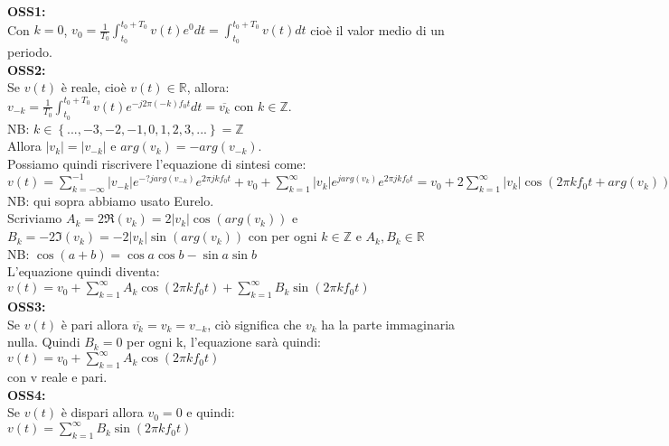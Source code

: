 	\textbf{OSS1:}\\
	Con $ k=0$, $ 
		v_0
		= \frac{1}{T_0}\int_{t_0}^{ t_0+T_0} v(t) e^0 dt
		=\int_{t_0}^{ t_0+T_0} v(t) dt
	$ cioè il valor medio di un periodo.\\ %
	\textbf{OSS2:}\\
	Se $ v(t) $ è reale, cioè $ v(t) \in \mathbb{R}$, allora:\\
	$ v_{-k} =\frac{1}{T_0} \int_{t_0}^{ t_0+T_0} v(t) e^{-j 2 \pi(-k) f_0 t} dt =\overline{v_k}  $ con $ k \in \mathbb{Z}$.\\
	NB: $ k \in \left \{ ...,-3,-2,-1,0,1,2,3,... \right \} = \mathbb{Z} $\\
	Allora $|v_k|=|v_{-k}| $ e $arg(v_k)= - arg(v_{-k}) $.\\
	Possiamo quindi riscrivere l'equazione di sintesi come:\\
	$
		v(t)
		=\sum_{k= -\infty}^{-1} |v_{-k}| e^{ -? j arg(v_{-k})} e^{2 \pi j k f_0 t}+ v_0+ \sum_{k= 1}^{ \infty} |v_{k}| e^{j arg(v_{k})} e^{2 \pi j k f_0 t}
		= v_0+ 2\sum_{k= 1}^{ \infty} |v_{k}| \cos( 2 \pi k f_0 t + arg(v_{k}))
	$\\
	NB: qui sopra abbiamo usato Eurelo.\\
	Scriviamo $ A_k = 2 \Re(v_k) = 2 |v_k| \cos (arg(v_k))$ e
	$ B_k = -2 \Im(v_k) = -2 |v_k| \sin (arg(v_k))$
	con per ogni $ k \in \mathbb{Z}$ e $ A_k,B_k \in \mathbb{R}$\\
	NB: $ \cos(a+b) = \cos a \cos b -\sin a\sin b$\\
	L'equazione quindi diventa:\\
	$
		v(t)
		= v_0+ \sum_{k= 1}^{ \infty} A_k \cos( 2 \pi k f_0 t)+ \sum_{k= 1}^{ \infty} B_k \sin ( 2 \pi k f_0 t)
	$\\
	
	\textbf{OSS3:}\\
	Se $ v(t) $ è pari allora $ \overline{v_k} = v_k = v_{-k} $, ciò significa che $ v_k $ ha la parte immaginaria nulla. Quindi $ B_k=0 $ per ogni k, l'equazione sarà quindi:\\
	$
		v(t)
		= v_0+ \sum_{k= 1}^{ \infty} A_k \cos( 2 \pi k f_0 t)
	$\\
	con v reale e pari.\\
	
	\textbf{OSS4:}\\ 
	Se $ v(t) $ è dispari allora $ v_0=0 $ e quindi:\\
	$
		v(t)
		= \sum_{k= 1}^{ \infty} B_k \sin( 2 \pi k f_0 t)
	$\\
	
